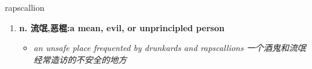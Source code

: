 
\begin{frame}
{\huge rapscallion}
\begin{center}
\begin{enumerate}\Large
  \item \textbf{n. 流氓,恶棍:a mean, evil, or unprincipled person}
  \begin{itemize}
    \item \em{\Large{an unsafe place frequented by drunkards and rapscallions 一个酒鬼和流氓经常造访的不安全的地方}}
  \end{itemize}
\end{enumerate}
\end{center}
\end{frame}
